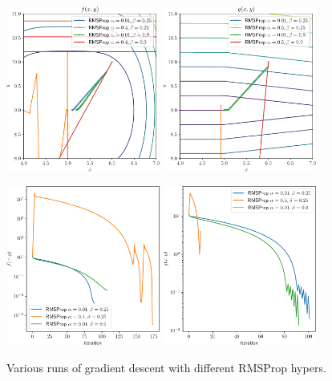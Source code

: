 \begin{figure}
  \begin{center}
    \includegraphics[width=0.45\textwidth]{fig/rmsprop-step-plot-f.pdf}
    \includegraphics[width=0.45\textwidth]{fig/rmsprop-step-plot-g.pdf}

    \includegraphics[width=0.45\textwidth]{fig/rmsprop-iterations-f.pdf}
    \includegraphics[width=0.45\textwidth]{fig/rmsprop-iterations-g.pdf}
  \end{center}
  \caption{Various runs of gradient descent with different RMSProp hypers.}\label{fig:rms-step-plots}
\end{figure}

